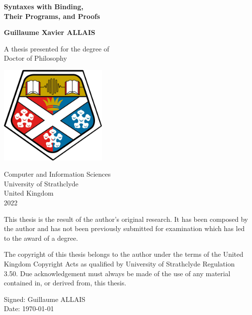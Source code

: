 \begin{titlingpage}
    \begin{center}
        \vspace*{1cm}

        \Huge
        \textbf{Syntaxes with Binding, \\ Their Programs, and Proofs}

        \vspace{1.5cm}

        \LARGE

        \textbf{Guillaume Xavier ALLAIS}

        \vfill

        A thesis presented for the degree of\\
        Doctor of Philosophy

        \vspace{0.8cm}

        \includegraphics[width=0.4\textwidth]{strath_coat}

        \vspace{0.8cm}

        \Large
        Computer and Information Sciences\\
        University of Strathclyde\\
        United Kingdom\\
        2022

    \end{center}
\end{titlingpage}


\pagebreak
{
\hspace{0pt}
\vfill{}
This thesis is the result of the author’s original research. It has been
composed by the author and has not been previously submitted for
examination which has led to the award of a degree.

The copyright of this thesis belongs to the author under the terms of the
United Kingdom Copyright Acts as qualified by University of Strathclyde
Regulation 3.50. Due acknowledgement must always be made of the use of
any material contained in, or derived from, this thesis.

\vspace{1.5cm}

\hfill
\begin{minipage}{0.4\textwidth}
Signed: Guillaume ALLAIS \\
Date: \today{}
\end{minipage}
\vfill
\hspace{0pt}
}
\pagebreak

